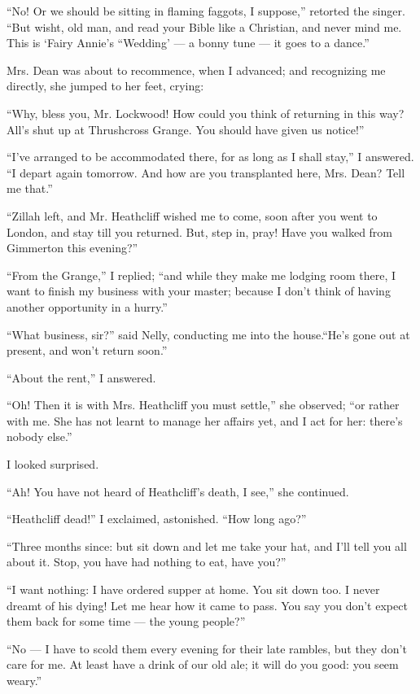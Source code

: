 \par “No! Or we should be sitting in flaming faggots, I suppose,” retorted the singer. “But wisht, old man, and read your Bible like a Christian, and never mind me. This is ‘Fairy Annie's “Wedding' — a bonny tune — it goes to a dance.”
\par Mrs. Dean was about to recommence, when I advanced; and recognizing me directly, she jumped to her feet, crying:
\par “Why, bless you, Mr. Lockwood! How could you think of returning in this way? All's shut up at Thrushcross Grange. You should have given us notice!”
\par “I've arranged to be accommodated there, for as long as I shall stay,” I answered. “I depart again tomorrow. And how are you transplanted here, Mrs. Dean? Tell me that.”
\par “Zillah left, and Mr. Heathcliff wished me to come, soon after you went to London, and stay till you returned. But, step in, pray! Have you walked from Gimmerton this evening?”
\par “From the Grange,” I replied; “and while they make me lodging room there, I want to finish my business with your master; because I don't think of having another opportunity in a hurry.”
\par “What business, sir?” said Nelly, conducting me into the house.“He's gone out at present, and won't return soon.”
\par “About the rent,” I answered.
\par “Oh! Then it is with Mrs. Heathcliff you must settle,” she observed; “or rather with me. She has not learnt to manage her affairs yet, and I act for her: there's nobody else.”
\par I looked surprised.
\par “Ah! You have not heard of Heathcliff's death, I see,” she continued.
\par “Heathcliff dead!” I exclaimed, astonished. “How long ago?”
\par “Three months since: but sit down and let me take your hat, and I'll tell you all about it. Stop, you have had nothing to eat, have you?”
\par “I want nothing: I have ordered supper at home. You sit down too. I never dreamt of his dying! Let me hear how it came to pass. You say you don't expect them back for some time — the young people?”
\par “No — I have to scold them every evening for their late rambles, but they don't care for me. At least have a drink of our old ale; it will do you good: you seem weary.”
